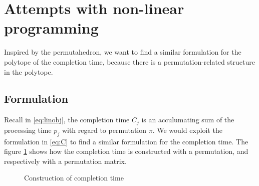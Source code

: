 \documentclass[12pt,letterpaper]{article}
\begin{document}
\section{Attempts with non-linear programming}
Inspired by the permutahedron, we want to find a similar formulation for the polytope of the completion time,
because there is a permutation-related structure in the polytope. 

\subsection{Formulation}
Recall in \ref{eq:linobj}, the completion time $C_j$ is 
an acculumating sum of the processing time $p_j$ with regard to 
permutation $\pi$. We would exploit the formulation in \ref{eq:C} 
to find a similar formulation for the completion time. The figure \ref{fig:completion}
shows how the completion time is constructed with a permutation, and respectively with a permutation matrix.
\begin{figure}[h!]
    \centering
    \caption{Construction of completion time}
    \label{fig:completion}
\end{figure}
\end{document}
